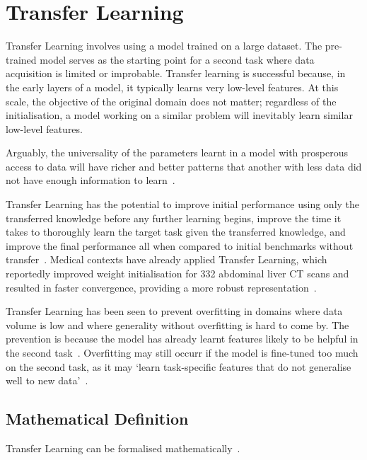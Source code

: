 \documentclass[12pt,twoside]{report}
\begin{document}
\section{Transfer Learning}

Transfer Learning involves using a model trained on a large dataset. The pre-trained model serves as the starting point for a second task where data acquisition is limited or improbable. Transfer learning is successful because, in the early layers of a model, it typically learns very low-level features. At this scale, the objective of the original domain does not matter; regardless of the initialisation, a model working on a similar problem will inevitably learn similar low-level features. 

Arguably, the universality of the parameters learnt in a model with prosperous access to data will have richer and better patterns that another with less data did not have enough information to learn~\cite{deep-learning-book, survey-on-transfer-learning}.

Transfer Learning has the potential to improve initial performance using only the transferred knowledge before any further learning begins, improve the time it takes to thoroughly learn the target task given the transferred knowledge, and improve the final performance all when compared to initial benchmarks without transfer~\cite{torrey-handbook}. Medical contexts have already applied Transfer Learning, which reportedly improved weight initialisation for 332 abdominal liver CT scans and resulted in faster convergence, providing a more robust representation~\cite{liver-lesion-via-transfer-learning}.

Transfer Learning has been seen to prevent overfitting in domains where data volume is low and where generality without overfitting is hard to come by. The prevention is because the model has already learnt features likely to be helpful in the second task~\cite{geeks-transfer-learning}. Overfitting may still occurr if the model is fine-tuned too much on the second task, as it may `learn task-specific features that do not generalise well to new data'~\cite{geeks-transfer-learning}.

\subsection{Mathematical Definition}

Transfer Learning can be formalised mathematically~\cite{survey-on-transfer-learning, concise-review-of-transfer-learning}.
\end{document}
